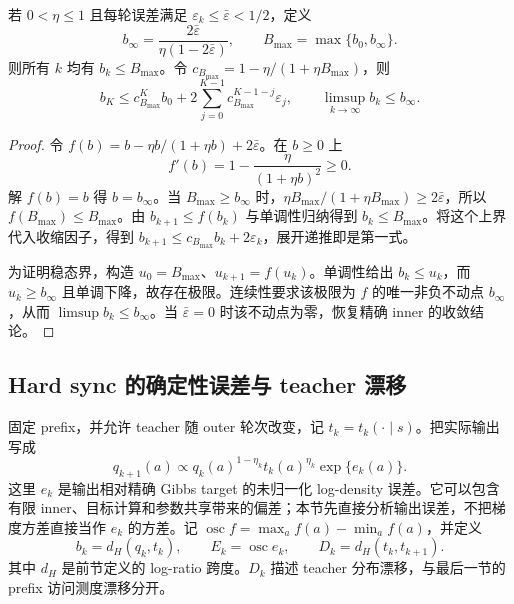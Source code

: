 \documentclass[lang=cn,scheme=chinese,openany]{../book/elegantbook}
\begin{document}
\begin{theorem}
若 $0<\eta\leq1$ 且每轮误差满足 $\varepsilon_k\leq\bar\varepsilon<1/2$，定义
\begin{equation*}
 b_\infty=\frac{2\bar\varepsilon}{\eta(1-2\bar\varepsilon)},\qquad
 B_{\max}=\max\{b_0,b_\infty\}.
\end{equation*}
则所有 $k$ 均有 $b_k\leq B_{\max}$。令 $c_{B_{\max}}=1-\eta/(1+\eta B_{\max})$，则
\begin{equation*}
 b_K\leq c_{B_{\max}}^K b_0+
     2\sum_{j=0}^{K-1}c_{B_{\max}}^{K-1-j}\varepsilon_j,
 \qquad \limsup_{k\to\infty}b_k\leq b_\infty.
\end{equation*}
\end{theorem}

\begin{proof}
令 $f(b)=b-\eta b/(1+\eta b)+2\bar\varepsilon$。在 $b\geq0$ 上
\begin{equation*}
 f'(b)=1-\frac{\eta}{(1+\eta b)^2}\geq0.
\end{equation*}
解 $f(b)=b$ 得 $b=b_\infty$。当 $B_{\max}\geq b_\infty$ 时，$\eta B_{\max}/(1+\eta B_{\max})\geq2\bar\varepsilon$，所以 $f(B_{\max})\leq B_{\max}$。由 $b_{k+1}\leq f(b_k)$ 与单调性归纳得到 $b_k\leq B_{\max}$。将这个上界代入收缩因子，得到 $b_{k+1}\leq c_{B_{\max}} b_k+2\varepsilon_k$，展开递推即是第一式。

为证明稳态界，构造 $u_0=B_{\max}$、$u_{k+1}=f(u_k)$。单调性给出 $b_k\leq u_k$，而 $u_k\geq b_\infty$ 且单调下降，故存在极限。连续性要求该极限为 $f$ 的唯一非负不动点 $b_\infty$，从而 $\limsup b_k\leq b_\infty$。当 $\bar\varepsilon=0$ 时该不动点为零，恢复精确 inner 的收敛结论。
\end{proof}



\subsection{Hard sync 的确定性误差与 teacher 漂移}
\label{dyn:sec:hs-noise}

固定 prefix，并允许 teacher 随 outer 轮次改变，记 $t_k=t_k(\cdot\mid s)$。把实际输出写成
\begin{equation}\label{dyn:eq:hs-noisy-update}
 q_{k+1}(a)\propto q_k(a)^{1-\eta_k}t_k(a)^{\eta_k}
             \exp\{e_k(a)\}.
\end{equation}
这里 $e_k$ 是输出相对精确 Gibbs target 的未归一化 log-density 误差。它可以包含有限 inner、目标计算和参数共享带来的偏差；本节先直接分析输出误差，不把梯度方差直接当作 $e_k$ 的方差。记 $\operatorname{osc}f=\max_a f(a)-\min_a f(a)$，并定义
\begin{equation*}
 b_k=d_H(q_k,t_k),\qquad E_k=\operatorname{osc}e_k,
 \qquad D_k=d_H(t_k,t_{k+1}).
\end{equation*}
其中 $d_H$ 是前节定义的 log-ratio 跨度。$D_k$ 描述 teacher 分布漂移，与最后一节的 prefix 访问测度漂移分开。
\end{document}
